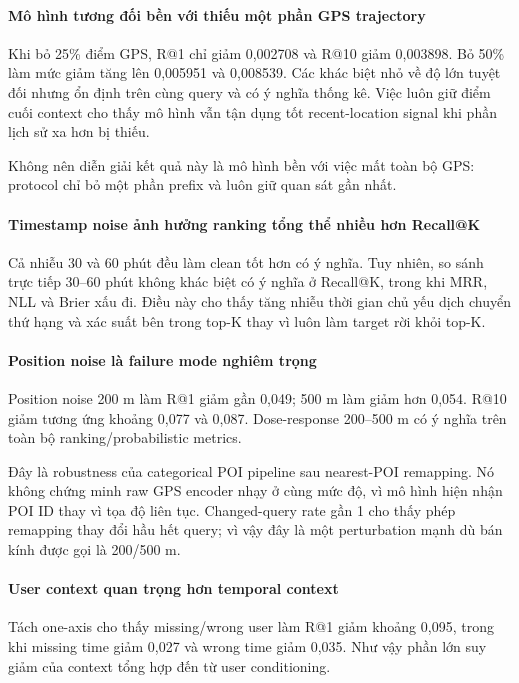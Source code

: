 \paragraph{Mô hình tương đối bền với thiếu một phần GPS trajectory}

Khi bỏ 25\% điểm GPS, R@1 chỉ giảm 0,002708 và R@10 giảm 0,003898. Bỏ 50\% làm mức giảm tăng lên 0,005951 và 0,008539. Các khác biệt nhỏ về độ lớn tuyệt đối nhưng ổn định trên cùng query và có ý nghĩa thống kê. Việc luôn giữ điểm cuối context cho thấy mô hình vẫn tận dụng tốt recent-location signal khi phần lịch sử xa hơn bị thiếu.

Không nên diễn giải kết quả này là mô hình bền với việc mất toàn bộ GPS: protocol chỉ bỏ một phần prefix và luôn giữ quan sát gần nhất.

\paragraph{Timestamp noise ảnh hưởng ranking tổng thể nhiều hơn Recall@K}

Cả nhiễu 30 và 60 phút đều làm clean tốt hơn có ý nghĩa. Tuy nhiên, so sánh trực tiếp 30--60 phút không khác biệt có ý nghĩa ở Recall@K, trong khi MRR, NLL và Brier xấu đi. Điều này cho thấy tăng nhiễu thời gian chủ yếu dịch chuyển thứ hạng và xác suất bên trong top-K thay vì luôn làm target rời khỏi top-K.

\paragraph{Position noise là failure mode nghiêm trọng}

Position noise 200 m làm R@1 giảm gần 0,049; 500 m làm giảm hơn 0,054. R@10 giảm tương ứng khoảng 0,077 và 0,087. Dose-response 200--500 m có ý nghĩa trên toàn bộ ranking/probabilistic metrics.

Đây là robustness của categorical POI pipeline sau nearest-POI remapping. Nó không chứng minh raw GPS encoder nhạy ở cùng mức độ, vì mô hình hiện nhận POI ID thay vì tọa độ liên tục. Changed-query rate gần 1 cho thấy phép remapping thay đổi hầu hết query; vì vậy đây là một perturbation mạnh dù bán kính được gọi là 200/500 m.

\paragraph{User context quan trọng hơn temporal context}

Tách one-axis cho thấy missing/wrong user làm R@1 giảm khoảng 0,095, trong khi missing time giảm 0,027 và wrong time giảm 0,035. Như vậy phần lớn suy giảm của context tổng hợp đến từ user conditioning.

